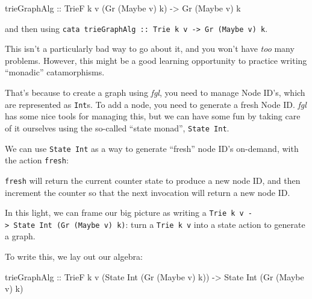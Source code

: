 \documentclass[]{article}
\newenvironment{Shaded}{}{}
\newcommand{\CommentTok}[1]{\textcolor[rgb]{0.38,0.63,0.69}{\textit{#1}}}
\newcommand{\DataTypeTok}[1]{\textcolor[rgb]{0.56,0.13,0.00}{#1}}
\newcommand{\DecValTok}[1]{\textcolor[rgb]{0.25,0.63,0.44}{#1}}
\newcommand{\FunctionTok}[1]{\textcolor[rgb]{0.02,0.16,0.49}{#1}}
\newcommand{\NormalTok}[1]{#1}
\newcommand{\OtherTok}[1]{\textcolor[rgb]{0.00,0.44,0.13}{#1}}
\begin{document}
\begin{Shaded}
\begin{Highlighting}[]
\NormalTok{trieGraphAlg}
\OtherTok{    ::} \DataTypeTok{TrieF}\NormalTok{ k v (}\DataTypeTok{Gr}\NormalTok{ (}\DataTypeTok{Maybe}\NormalTok{ v) k)}
    \OtherTok{->} \DataTypeTok{Gr}\NormalTok{ (}\DataTypeTok{Maybe}\NormalTok{ v) k}
\end{Highlighting}
\end{Shaded}

and then using
\texttt{cata\ trieGraphAlg\ ::\ Trie\ k\ v\ -\textgreater{}\ Gr\ (Maybe\ v)\ k}.

This isn't a particularly bad way to go about it, and you won't have \emph{too}
many problems. However, this might be a good learning opportunity to practice
writing ``monadic'' catamorphisms.

That's because to create a graph using \emph{fgl}, you need to manage Node ID's,
which are represented as \texttt{Int}s. To add a node, you need to generate a
fresh Node ID. \emph{fgl} has some nice tools for managing this, but we can have
some fun by taking care of it ourselves using the so-called ``state monad'',
\texttt{State\ Int}.

We can use \texttt{State\ Int} as a way to generate ``fresh'' node ID's
on-demand, with the action \texttt{fresh}:

\begin{Shaded}
\end{Shaded}

\texttt{fresh} will return the current counter state to produce a new node ID,
and then increment the counter so that the next invocation will return a new
node ID.

In this light, we can frame our big picture as writing a
\texttt{Trie\ k\ v\ -\textgreater{}\ State\ Int\ (Gr\ (Maybe\ v)\ k)}: turn a
\texttt{Trie\ k\ v} into a state action to generate a graph.

To write this, we lay out our algebra:

\begin{Shaded}
\begin{Highlighting}[]
\NormalTok{trieGraphAlg}
\OtherTok{    ::} \DataTypeTok{TrieF}\NormalTok{ k v (}\DataTypeTok{State} \DataTypeTok{Int}\NormalTok{ (}\DataTypeTok{Gr}\NormalTok{ (}\DataTypeTok{Maybe}\NormalTok{ v) k))}
    \OtherTok{->} \DataTypeTok{State} \DataTypeTok{Int}\NormalTok{ (}\DataTypeTok{Gr}\NormalTok{ (}\DataTypeTok{Maybe}\NormalTok{ v) k)}
\end{Highlighting}
\end{Shaded}
\end{document}
